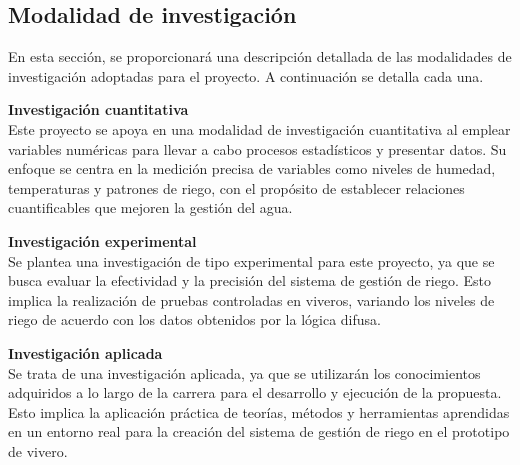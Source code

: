 \subsection{Modalidad de investigación}
En esta sección, se proporcionará una descripción detallada de las modalidades de investigación adoptadas para el proyecto. A continuación se detalla cada una.

\bigbreak
\textbf{Investigación cuantitativa}\\
Este proyecto se apoya en una modalidad de investigación cuantitativa al emplear variables numéricas para llevar a cabo procesos estadísticos y presentar datos. Su enfoque se centra en la medición precisa de variables como niveles de humedad, temperaturas y patrones de riego, con el propósito de establecer relaciones cuantificables que mejoren la gestión del agua.

\bigbreak
\textbf{Investigación experimental}\\
Se plantea una investigación de tipo experimental para este proyecto, ya que se busca evaluar la efectividad y la precisión del sistema de gestión de riego. Esto implica la realización de pruebas controladas en viveros, variando los niveles de riego de acuerdo con los datos obtenidos por la lógica difusa.

\bigbreak
\textbf{Investigación aplicada}\\
Se trata de una investigación aplicada, ya que se utilizarán los conocimientos adquiridos a lo largo de la carrera para el desarrollo y ejecución de la propuesta. Esto implica la aplicación práctica de teorías, métodos y herramientas aprendidas en un entorno real para la creación del sistema de gestión de riego en el prototipo de vivero.
